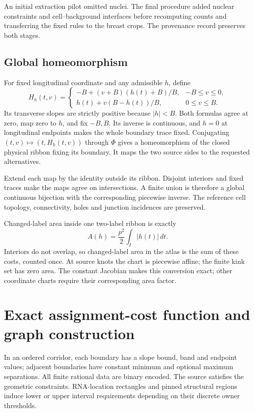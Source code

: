 \documentclass[10pt,letterpaper]{article}
\begin{document}
An initial extraction pilot omitted nuclei. The final procedure added nuclear constraints and cell--background interfaces before recomputing counts and transferring the fixed rules to the breast crops. The provenance record preserves both stages.

\subsection{Global homeomorphism}
For fixed longitudinal coordinate and any admissible $h$, define
\[
 H_h(t,v)=\begin{cases}
 -B+(v+B)(h(t)+B)/B,&-B\le v\le0,\\
 h(t)+v(B-h(t))/B,&0\le v\le B.
 \end{cases}
\]
Its transverse slopes are strictly positive because $|h|<B$. Both formulas agree at zero, map zero to $h$, and fix $-B,B$. Its inverse is continuous, and $h=0$ at longitudinal endpoints makes the whole boundary trace fixed. Conjugating $(t,v)\mapsto(t,H_h(t,v))$ through $\Phi$ gives a homeomorphism of the closed physical ribbon fixing its boundary. It maps the two source sides to the requested alternatives.

Extend each map by the identity outside its ribbon. Disjoint interiors and fixed traces make the maps agree on intersections. A finite union is therefore a global continuous bijection with the corresponding piecewise inverse. The reference cell topology, connectivity, holes and junction incidences are preserved.

Changed-label area inside one two-label ribbon is exactly
\[
 A(h)=\frac{p^2}{2}\int_I |h(t)|\,dt.
\]
Interiors do not overlap, so changed-label area in the atlas is the sum of these costs, counted once. At source knots the chart is piecewise affine; the finite kink set has zero area. The constant Jacobian makes this conversion exact; other coordinate charts require their corresponding area factor.

\section{Exact assignment-cost function and graph construction}
In an ordered corridor, each boundary has a slope bound, band and endpoint values; adjacent boundaries have constant minimum and optional maximum separations. All finite rational data are binary encoded. The source satisfies the geometric constraints. RNA-location rectangles and pinned structural regions induce lower or upper interval requirements depending on their discrete owner thresholds.
\end{document}
